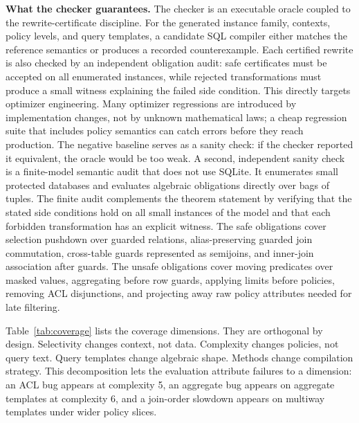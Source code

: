 \documentclass[conference]{IEEEtran}
\begin{document}
\noindent\textbf{What the checker guarantees.}
The checker is an executable oracle coupled to the rewrite-certificate discipline. For the generated instance family, contexts, policy levels, and query templates, a candidate SQL compiler either matches the reference semantics or produces a recorded counterexample. Each certified rewrite is also checked by an independent obligation audit: safe certificates must be accepted on all enumerated instances, while rejected transformations must produce a small witness explaining the failed side condition. This directly targets optimizer engineering. Many optimizer regressions are introduced by implementation changes, not by unknown mathematical laws; a cheap regression suite that includes policy semantics can catch errors before they reach production. The negative baseline serves as a sanity check: if the checker reported it equivalent, the oracle would be too weak. A second, independent sanity check is a finite-model semantic audit that does not use SQLite. It enumerates small protected databases and evaluates algebraic obligations directly over bags of tuples. The finite audit complements the theorem statement by verifying that the stated side conditions hold on all small instances of the model and that each forbidden transformation has an explicit witness. The safe obligations cover selection pushdown over guarded relations, alias-preserving guarded join commutation, cross-table guards represented as semijoins, and inner-join association after guards. The unsafe obligations cover moving predicates over masked values, aggregating before row guards, applying limits before policies, removing ACL disjunctions, and projecting away raw policy attributes needed for late filtering.

Table~\ref{tab:coverage} lists the coverage dimensions. They are orthogonal by design. Selectivity changes context, not data. Complexity changes policies, not query text. Query templates change algebraic shape. Methods change compilation strategy. This decomposition lets the evaluation attribute failures to a dimension: an ACL bug appears at complexity 5, an aggregate bug appears on aggregate templates at complexity 6, and a join-order slowdown appears on multiway templates under wider policy slices.
\end{document}
